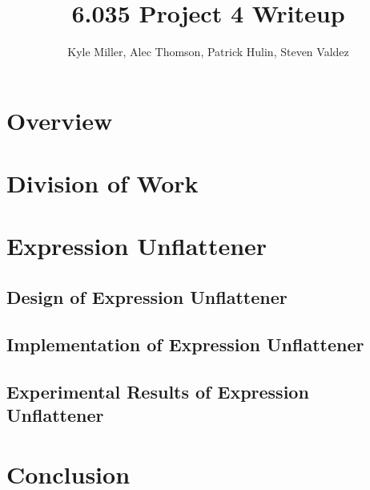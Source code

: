 \documentclass[11pt]{article}
\title{6.035 Project 4 Writeup}
\author{Kyle Miller, Alec Thomson, Patrick Hulin, Steven Valdez}
\begin{document}
\maketitle

\section {Overview}

\section {Division of Work}

\section {Expression Unflattener}

\subsection{Design of Expression Unflattener}

\subsection{Implementation of Expression Unflattener}

\subsection{Experimental Results of Expression Unflattener}

\section{Conclusion}
\end{document}
